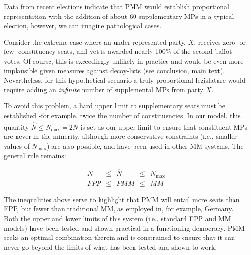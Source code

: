 Data from recent elections indicate that PMM would establish proportional representation with the addition of about 60 supplementary MPs in a typical election, however, we can imagine pathological cases.

Consider the extreme case where an under-represented party, $X$, receives zero \--or few\-- constituency seats, and yet is awarded nearly 100\% of the second-ballot votes.
Of course, this is exceedingly unlikely in practice and would be even more implausible given measures against decoy-lists (see conclusion, main text).
Nevertheless, for this hypothetical scenario a truly proportional legislature would require adding an \emph{infinite} number of supplemental MPs from party \textbf{$X$}.

To avoid this problem, a hard upper limit to supplementary seats must be established \--for example, twice the number of constituencies. In our model, this quantity $\hat N \stackrel{!}{\le} N_{\textrm{max}} = 2 N$ is set as our upper-limit to ensure that constituent MPs are never in the minority, although more conservative constraints (i.e., smaller values of $N_{\textrm{max}}$) are also possible, and have been used in other MM systems.
The general rule remains:

\begin{align}
\label{eq:Nlimits}
N &\le& \hat{N} &\le& N_{\textrm{max}} \\
FPP &\le& PMM &\le& MM
\end{align}

The inequalities above serve to highlight that PMM will entail more seats than FPP, but fewer than traditional MM, as employed in, for example, Germany.
Both the upper and lower limits of this system (i.e., standard FPP and MM models) have been tested and shown practical in a functioning democracy. PMM seeks an optimal combination therein and is constrained to ensure that it can never go beyond the limits of what has been tested and shown to work.


